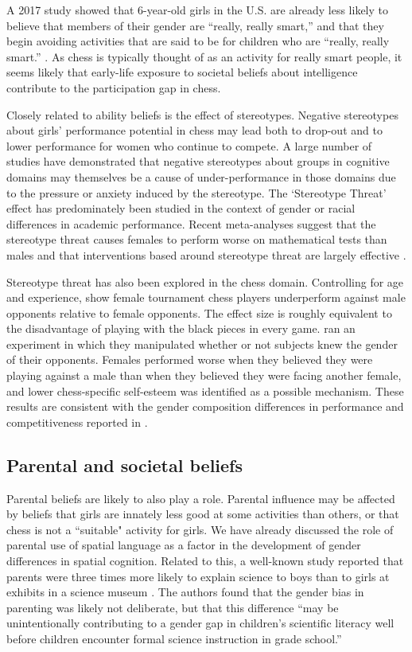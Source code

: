 \documentclass[9pt,twocolumn,twoside,lineno]{pnas-new}
\begin{document}
A 2017 study showed that 6-year-old girls in the U.S. are already less likely to believe that members of their gender are “really, really smart,” and that they begin avoiding activities that are said to be for children who are “really, really smart.” \cite{bian2017gender}. As chess is typically thought of as an activity for really smart people, it seems likely that early-life exposure to societal beliefs about intelligence contribute to the participation gap in chess.

Closely related to ability beliefs is the effect of stereotypes. Negative stereotypes about girls' performance potential in chess may lead both to drop-out and to lower performance for women who  continue to compete. A large number of studies have demonstrated that negative stereotypes about groups in cognitive domains may themselves be a cause of under-performance in those domains due to the pressure or anxiety induced by the stereotype. The `Stereotype Threat' effect has predominately been studied in the context of gender or racial differences in academic performance. Recent meta-analyses suggest that the stereotype threat causes females to perform worse on mathematical tests than males \cite{picho2013} and that interventions based around stereotype threat are largely effective \cite{liu2020}.

Stereotype threat has also been explored in the chess domain. Controlling for age and experience, \cite{smerdon2020female} show female tournament chess players underperform against male opponents relative to female opponents. The effect size is roughly equivalent to the disadvantage of playing with the black pieces in every game. \citep{maass2008} ran an experiment in which they manipulated whether or not subjects knew the gender of their opponents. Females performed worse when they believed they were playing against a male than when they believed they were facing another female, and lower chess-specific self-esteem was identified as a possible mechanism. These results are consistent with the gender composition differences in performance and competitiveness reported in \cite{gneezy2003}.

\subsection*{Parental and societal beliefs}
Parental beliefs are likely to also play a role. Parental influence may be affected by beliefs that girls are innately less good at some activities than others, or that chess is not a ``suitable" activity for girls. We have already discussed the role of parental use of spatial language as a factor in the development of gender differences in spatial cognition. Related to this, a well-known study reported that parents were three times more likely to explain science to boys than to girls at exhibits in a science museum \cite{crowley2001}. The authors found that the gender bias in parenting was likely not deliberate, but that this difference ``may be unintentionally contributing to a gender gap in children’s scientific literacy well before children encounter formal science instruction in grade school.'' 
\end{document}
